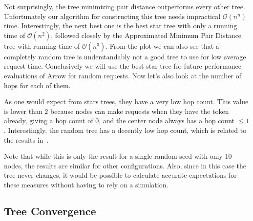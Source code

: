 \documentclass[a4paper, oneside]{discothesis}
\begin{document}
Not surprisingly, the tree minimizing pair distance outperforms every other tree. Unfortunately our algorithm for constructing this tree needs impractical $\mathcal{O}(n^n)$ time. Interestingly, the next best one is the best star tree with only a running time of $\mathcal{O}(n^2)$, followed closely by the Approximated Minimum Pair Distance tree with running time of $\mathcal{O}(n^3)$. From the plot we can also see that a completely random tree is understandably not a good tree to use for low average request time. Conclusively we will use the best star tree for future performance evaluations of Arrow for random requests. Now let's also look at the number of hops for each of them.


As one would expect from stars trees, they have a very low hop count. This value is lower than $2$ because nodes can make requests when they have the token already, giving a hop count of $0$, and the center node always has a hop count $\leq 1$. Interestingly, the random tree has a decently low hop count, which is related to the results in~\cite{Ray, Height}.

Note that while this is only the result for a single random seed with only 10 nodes, the results are similar for other configurations. Also, since in this case the tree never changes, it would be possible to calculate accurate expectations for these measures without having to rely on a simulation.

\subsection{Tree Convergence}\label{result:convergence}
\end{document}
